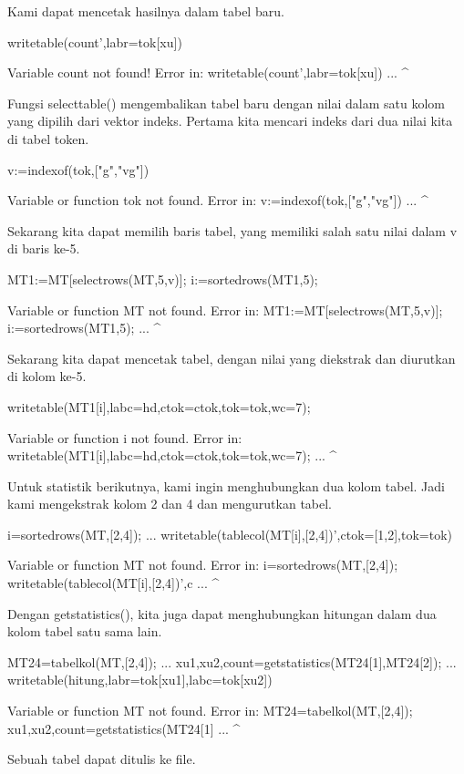 \documentclass{article}
\begin{document}
Kami dapat mencetak hasilnya dalam tabel baru.


\>writetable(count',labr=tok[xu])


    Variable count not found!
    Error in:
    writetable(count',labr=tok[xu]) ...
                     ^

Fungsi selecttable() mengembalikan tabel baru dengan nilai dalam satu
kolom yang dipilih dari vektor indeks. Pertama kita mencari indeks
dari dua nilai kita di tabel token.


\>v:=indexof(tok,["g","vg"])


    Variable or function tok not found.
    Error in:
    v:=indexof(tok,["g","vg"]) ...
                  ^

Sekarang kita dapat memilih baris tabel, yang memiliki salah satu
nilai dalam v di baris ke-5.


\>MT1:=MT[selectrows(MT,5,v)]; i:=sortedrows(MT1,5);


    Variable or function MT not found.
    Error in:
    MT1:=MT[selectrows(MT,5,v)]; i:=sortedrows(MT1,5); ...
                         ^

Sekarang kita dapat mencetak tabel, dengan nilai yang diekstrak dan
diurutkan di kolom ke-5.


\>writetable(MT1[i],labc=hd,ctok=ctok,tok=tok,wc=7);


    Variable or function i not found.
    Error in:
    writetable(MT1[i],labc=hd,ctok=ctok,tok=tok,wc=7); ...
                    ^

Untuk statistik berikutnya, kami ingin menghubungkan dua kolom tabel.
Jadi kami mengekstrak kolom 2 dan 4 dan mengurutkan tabel.


\>i=sortedrows(MT,[2,4]);  ...  
\>     writetable(tablecol(MT[i],[2,4])',ctok=[1,2],tok=tok)


    Variable or function MT not found.
    Error in:
    i=sortedrows(MT,[2,4]);    writetable(tablecol(MT[i],[2,4])',c ...
                   ^

Dengan getstatistics(), kita juga dapat menghubungkan hitungan dalam
dua kolom tabel satu sama lain.


\>MT24=tabelkol(MT,[2,4]); ...  
\>   {xu1,xu2,count}=getstatistics(MT24[1],MT24[2]); ...  
\>   writetable(hitung,labr=tok[xu1],labc=tok[xu2])


    Variable or function MT not found.
    Error in:
    MT24=tabelkol(MT,[2,4]); {xu1,xu2,count}=getstatistics(MT24[1] ...
                    ^

Sebuah tabel dapat ditulis ke file.
\end{document}
